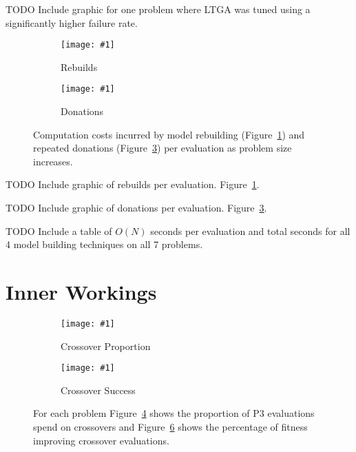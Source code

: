 \documentclass[twoside]{article}
\newcommand{\includegraphicsfit}[1]
{\texttt{[image: \#1]}}
\begin{document}
TODO Include graphic for one problem where LTGA was tuned using a significantly higher failure rate.

\begin{figure}[t]
  \begin{centering}
    \begin{subfigure}{.5\textwidth}
      \begin{centering}
        \includegraphicsfit{rebuilds}
      \end{centering}
      \caption{Rebuilds}
      \label{fig-rebuilds}
    \end{subfigure}%
    \begin{subfigure}{.5\textwidth}
      \begin{centering}
        \includegraphicsfit{donations}
      \end{centering}
      \caption{Donations}
      \label{fig-donations}
    \end{subfigure}
  \end{centering}
  \caption{Computation costs incurred by model rebuilding (Figure~\ref{fig-rebuilds}) and
           repeated donations (Figure~\ref{fig-donations}) per evaluation as problem size increases.}
\end{figure}

TODO Include graphic of rebuilds per evaluation. Figure~\ref{fig-rebuilds}.

TODO Include graphic of donations per evaluation. Figure~\ref{fig-donations}.

TODO Include a table of $O(N)$ seconds per evaluation and total seconds for all 4 model building techniques on all 7 problems.

\section{Inner Workings}

\begin{figure}[t]
  \begin{centering}
    \begin{subfigure}{.5\textwidth}
      \begin{centering}
        \includegraphicsfit{cross}
      \end{centering}
      \caption{Crossover Proportion}
      \label{fig-cross}
    \end{subfigure}%
    \begin{subfigure}{.5\textwidth}
      \begin{centering}
        \includegraphicsfit{cross-success}
      \end{centering}
      \caption{Crossover Success}
      \label{fig-cross-success}
    \end{subfigure}
  \end{centering}
  \caption{For each problem Figure~\ref{fig-cross} shows the proportion of P3 evaluations spend on crossovers
           and Figure~\ref{fig-cross-success} shows the percentage of fitness improving crossover evaluations.}
\end{figure}
\end{document}
